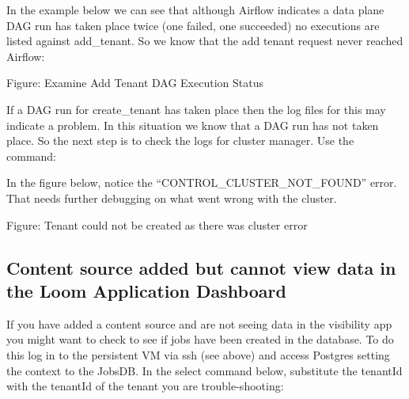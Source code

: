 \documentclass[letterpaper,10pt,english]{sphinxmanual}
\begin{document}
In the example below we can see that although Airflow indicates a data plane DAG run has taken place twice (one failed, one succeeded) no executions are listed against add\_tenant. So we know that the add tenant request never reached Airflow:

\begin{figure}[htbp]
\centering

\noindent{}
\end{figure}

Figure: Examine Add Tenant DAG Execution Status

If a DAG run for create\_tenant has taken place then the log files for this may indicate a problem.
In this situation we know that a DAG run has not taken place. So the next step is to check the logs for cluster manager. Use the command:

\begin{sphinxVerbatim}[commandchars=\\\{\}]
       
\end{sphinxVerbatim}

In the figure below, notice the “CONTROL\_CLUSTER\_NOT\_FOUND” error. That needs further debugging on what went wrong with the cluster.

\begin{figure}[htbp]
\centering

\noindent{}
\end{figure}

Figure: Tenant could not be created as there was cluster error


\subsection{Content source added but cannot view data in the Loom Application Dashboard}
\label{\detokenize{loom_installation_guide:content-source-added-but-cannot-view-data-in-the-loom-application-dashboard}}
If you have added a content source and are not seeing data in the visibility app you might want to check to see if jobs have been created in the database. To do this log in to the persistent VM via ssh (see above) and access Postgres setting the context to the JobsDB. In the select command below, substitute the tenantId with the tenantId of the tenant you are trouble-shooting:
\end{document}
